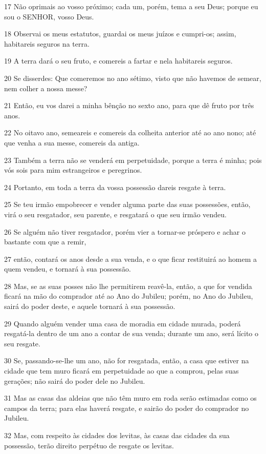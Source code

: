 \par 17 Não oprimais ao vosso próximo; cada um, porém, tema a seu Deus; porque eu sou o SENHOR, vosso Deus.
\par 18 Observai os meus estatutos, guardai os meus juízos e cumpri-os; assim, habitareis seguros na terra.
\par 19 A terra dará o seu fruto, e comereis a fartar e nela habitareis seguros.
\par 20 Se disserdes: Que comeremos no ano sétimo, visto que não havemos de semear, nem colher a nossa messe?
\par 21 Então, eu vos darei a minha bênção no sexto ano, para que dê fruto por três anos.
\par 22 No oitavo ano, semeareis e comereis da colheita anterior até ao ano nono; até que venha a sua messe, comereis da antiga.
\par 23 Também a terra não se venderá em perpetuidade, porque a terra é minha; pois vós sois para mim estrangeiros e peregrinos.
\par 24 Portanto, em toda a terra da vossa possessão dareis resgate à terra.
\par 25 Se teu irmão empobrecer e vender alguma parte das suas possessões, então, virá o seu resgatador, seu parente, e resgatará o que seu irmão vendeu.
\par 26 Se alguém não tiver resgatador, porém vier a tornar-se próspero e achar o bastante com que a remir,
\par 27 então, contará os anos desde a sua venda, e o que ficar restituirá ao homem a quem vendeu, e tornará à sua possessão.
\par 28 Mas, se as suas posses não lhe permitirem reavê-la, então, a que for vendida ficará na mão do comprador até ao Ano do Jubileu; porém, no Ano do Jubileu, sairá do poder deste, e aquele tornará à sua possessão.
\par 29 Quando alguém vender uma casa de moradia em cidade murada, poderá resgatá-la dentro de um ano a contar de sua venda; durante um ano, será lícito o seu resgate.
\par 30 Se, passando-se-lhe um ano, não for resgatada, então, a casa que estiver na cidade que tem muro ficará em perpetuidade ao que a comprou, pelas suas gerações; não sairá do poder dele no Jubileu.
\par 31 Mas as casas das aldeias que não têm muro em roda serão estimadas como os campos da terra; para elas haverá resgate, e sairão do poder do comprador no Jubileu.
\par 32 Mas, com respeito às cidades dos levitas, às casas das cidades da sua possessão, terão direito perpétuo de resgate os levitas.
